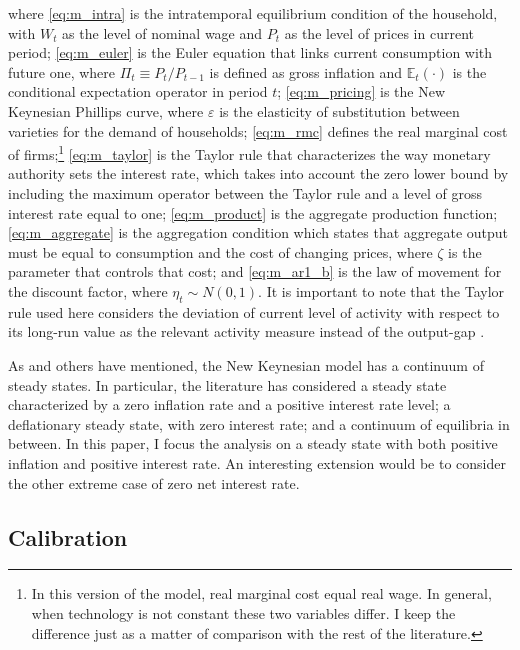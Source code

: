 \documentclass[12pt]{article}
\numberwithin{equation}{section}
\begin{document}
\noindent where \eqref{eq:m_intra} is the intratemporal equilibrium condition of the household, with $W_t$ as the level of nominal wage and $P_t$ as the level of prices in current period; \eqref{eq:m_euler} is the Euler equation that links current consumption with future one, where $\Pi_t\equiv P_t/P_{t-1}$ is defined as gross inflation and $\mathbb{E}_t(\cdot)$ is the conditional expectation operator in period $t$; \eqref{eq:m_pricing} is the New Keynesian Phillips curve, where $\varepsilon$ is the elasticity of substitution between varieties for the demand of households; \eqref{eq:m_rmc} defines the real marginal cost of firms;\footnote{In this version of the model, real marginal cost equal real wage. In general, when technology is not constant these two variables differ. I keep the difference just as a matter of comparison with the rest of the literature.} \eqref{eq:m_taylor} is the Taylor rule that characterizes the way monetary authority sets the interest rate, which takes into account the zero lower bound by including the maximum operator between the Taylor rule and a level of gross interest rate equal to one; \eqref{eq:m_product} is the aggregate production function; \eqref{eq:m_aggregate} is the aggregation condition which states that aggregate output must be equal to consumption and the cost of changing prices, where $\zeta$ is the parameter that controls that cost; and \eqref{eq:m_ar1_b} is the law of movement for the discount factor, where $\eta_t\sim N(0,1)$. It is important to note that the Taylor rule used here considers the deviation of current level of activity with respect to its long-run value as the relevant activity measure instead of the output-gap \citep{Gali2015}.

As \cite{BenhabibEtAl2001a} and others have mentioned, the New Keynesian model has a continuum of steady states. In particular, the literature has considered a steady state characterized by a zero inflation rate and a positive interest rate level; a deflationary steady state, with zero interest rate; and a continuum of equilibria in between. In this paper, I focus the analysis on a steady state with both positive inflation and positive interest rate. An interesting extension would be to consider the other extreme case of zero net interest rate.

\subsection{Calibration}
\end{document}
